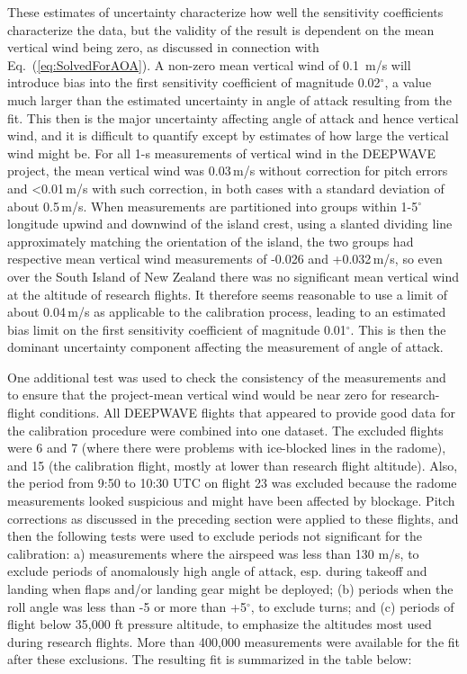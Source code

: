 \documentclass[12pt,twoside,english]{article}\usepackage[]{graphicx}\usepackage[]{color}
\let\OrgIndex\index
\renewcommand*{\index}[1]{\OrgIndex{#1}}
\begin{document}
{{These estimates of uncertainty characterize how well the sensitivity coefficients characterize the data, but the validity of the result is dependent on the mean vertical wind being zero, as discussed in connection with Eq.~(\ref{eq:SolvedForAOA}). A non-zero mean vertical wind of 0.1~m/s will introduce bias into the first sensitivity coefficient of magnitude 0.02$^{\circ}$, a value much larger than the estimated uncertainty in angle of attack resulting from the fit. This then is the major uncertainty affecting angle of attack and hence vertical wind, and it is difficult to quantify except by estimates of how large the vertical wind might be. For all 1-s measurements of vertical wind in the DEEPWAVE project, the mean vertical wind was 0.03\,m/s without correction for pitch errors and <0.01\,m/s with such correction, in both cases with a standard deviation of about 0.5\,m/s. When measurements are partitioned into groups within 1-5$^{\circ}$ longitude upwind and downwind of the island crest, using a slanted dividing line approximately matching the orientation of the island, the two groups had respective mean vertical wind measurements of -0.026 and +0.032\,m/s, so even over the South Island of New Zealand there was no significant mean vertical wind at the altitude of research flights. It therefore seems reasonable to use a limit of about 0.04\,m/s as applicable to the calibration process, leading to an estimated bias limit on the first sensitivity coefficient of magnitude 0.01$^{\circ}$. This is then the dominant uncertainty component affecting the measurement of angle of attack. 

One additional test was used to check the consistency of the measurements and to ensure that the project-mean vertical wind would be near zero for research-flight conditions. All DEEPWAVE flights that appeared to provide good data for the calibration procedure were combined into one dataset. The excluded flights were 6 and 7 (where there were problems with ice-blocked lines in the radome), and 15 (the calibration flight, mostly at lower than research flight altitude). Also, the period from 9:50 to 10:30 UTC on flight 23 was excluded because the radome measurements looked suspicious and might have been affected by blockage. Pitch corrections as discussed in the preceding section were applied to these flights, and then the following tests were used to exclude periods not significant for the calibration: a) measurements where the airspeed was less than 130 m/s, to exclude periods of anomalously high angle of attack, esp. during takeoff and landing when flaps and/or landing gear might be deployed; (b) periods when the roll angle was less than -5 or more than +5$^{\circ}$, to exclude turns; and (c) periods of flight below 35,000 ft pressure altitude, to emphasize the altitudes most used during research flights. More than 400,000 measurements were available for the fit after these exclusions. The resulting fit is summarized in the table below:



}}
\end{document}
